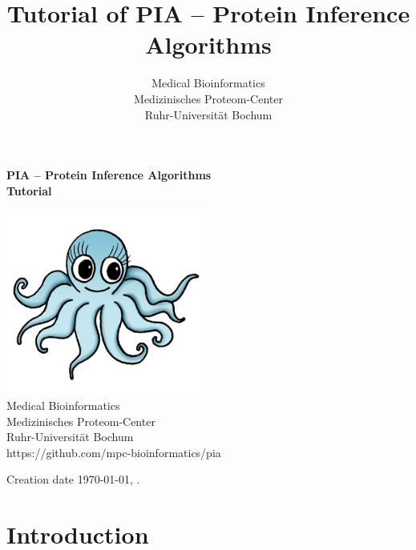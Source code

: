 \documentclass[a4paper,11pt,twoside]{article}
\title{Tutorial of PIA -- Protein Inference Algorithms}
\author{Medical Bioinformatics\\
	Medizinisches Proteom-Center\\
	Ruhr-Universität Bochum}
\begin{document}
\thispagestyle{empty}
\begin{titlepage}
	\vspace*{\fill}
	\begin{adjustwidth}{-2cm}{-2cm}
		\begin{center}
			{\huge \textbf{PIA -- Protein Inference Algorithms\\
					Tutorial}\\[2cm]}
		\end{center}
	\end{adjustwidth}

	\begin{center}
		\includegraphics[width=0.5\textwidth]{graphics/pia_logo_big}\\[2cm]

		{\large Medical Bioinformatics\\
			Medizinisches Proteom-Center\\
			Ruhr-Universität Bochum\\[0.5cm]}
		{\large https://github.com/mpc-bioinformatics/pia\\[0.1cm]}
	\end{center}

	\vspace*{2cm}
	\begin{center}
		Creation date \today{}, \currenttime{}.
	\end{center}
	\vspace*{\fill}
\end{titlepage}


\tableofcontents
\newpage


\section{Introduction}
\end{document}
